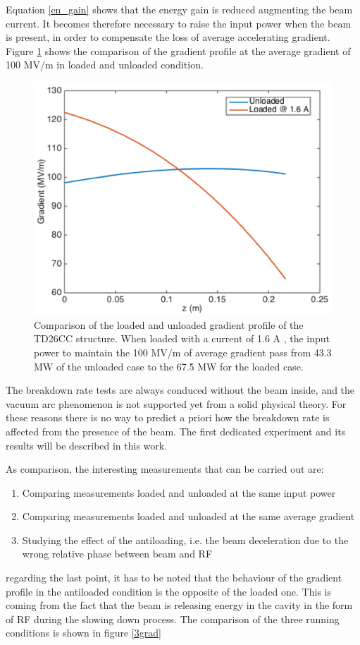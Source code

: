 Equation \ref{en_gain} shows that the energy gain is reduced augmenting the beam current. It becomes therefore necessary to raise the input power when the beam is present, in order to compensate the loss of average accelerating gradient. Figure \ref{100mvm} shows the comparison of the gradient profile at the average gradient of 100 MV/m in loaded and unloaded condition.

\begin{figure}[h]
\centering 
\includegraphics[scale=1]{pictures/grad_vs_IP.png}
\caption{Comparison of the loaded and unloaded gradient profile of the TD26CC structure. When loaded with a current of 1.6 A , the input power to maintain the 100 MV/m of average gradient pass from 43.3 MW of the unloaded case to the 67.5 MW for the loaded case. }
\label{100mvm}
\end{figure}

The breakdown rate tests are always conduced without the beam inside, and the vacuum arc phenomenon is not supported yet from a solid physical theory. For these reasons there is no way to predict a priori how the breakdown rate is affected from the presence of the beam. The first dedicated experiment and its results will be described in this work.

As comparison, the interesting measurements that can be carried out are:
\begin{enumerate}
\item Comparing measurements loaded and unloaded at the same input power
\item Comparing measurements loaded and unloaded at the same average gradient
\item Studying the effect of the antiloading, i.e. the beam deceleration due to the wrong relative phase between beam and RF
\end{enumerate}
regarding the last point, it has to be noted that the behaviour of the gradient profile in the antiloaded condition is the opposite of the loaded one. This is coming from the fact that the beam is releasing energy in the cavity in the form of RF during the slowing down process. The comparison of the three running conditions is shown in figure \ref{3grad}

